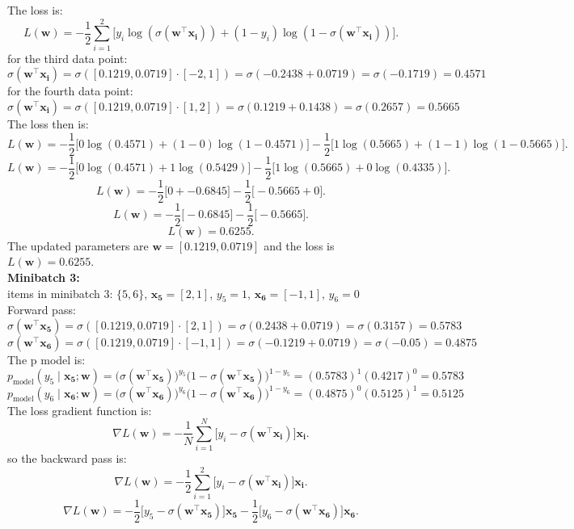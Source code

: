 \documentclass[a3paper,12pt]{article} %
\begin{document}
The loss is:
\[
L(\mathbf{w}) = -\frac{1}{2} \sum^2_{i=1} \big[y_i \log(\sigma(\mathbf{w}^\top \mathbf{x_i})) + (1-y_i) \log(1-\sigma(\mathbf{w}^\top \mathbf{x_i}))\big].
\]
for the third data point:
\[
    \sigma(\mathbf{w}^\top \mathbf{x_i}) = \sigma([0.1219, 0.0719] \cdot [-2, 1]) = \sigma(-0.2438 + 0.0719) = \sigma(-0.1719) = 0.4571
\]
for the fourth data point:
\[
    \sigma(\mathbf{w}^\top \mathbf{x_i}) = \sigma([0.1219, 0.0719] \cdot [1, 2]) = \sigma(0.1219 + 0.1438) = \sigma(0.2657) = 0.5665
\]
The loss then is:
\[
L(\mathbf{w}) = -\frac{1}{2} \big[0 \log(0.4571) + (1-0) \log(1-0.4571)\big] - \frac{1}{2} \big[1 \log(0.5665) + (1-1) \log(1-0.5665)\big].
\]
\[
L(\mathbf{w}) = -\frac{1}{2} \big[0 \log(0.4571) + 1 \log(0.5429)\big] - \frac{1}{2} \big[1 \log(0.5665) + 0 \log(0.4335)\big].
\]
\[
L(\mathbf{w}) = -\frac{1}{2} \big[0 + -0.6845\big] - \frac{1}{2} \big[-0.5665 + 0\big].
\]
\[
L(\mathbf{w}) = -\frac{1}{2} \big[-0.6845\big] - \frac{1}{2} \big[-0.5665\big].
\]
\[
L(\mathbf{w}) = 0.6255.
\]
The updated parameters are \(\mathbf{w} = \mathbf{[0.1219, 0.0719]}\) and the loss is \(L(\mathbf{w}) = \mathbf{0.6255}\).
\\ \textbf{Minibatch 3:}
\\ items in minibatch 3: \(\{5, 6\}\), \(\mathbf{x_5} = [2, 1]\), \(y_5 = 1\), \(\mathbf{x_6} = [-1, 1]\), \(y_6 = 0\)
\\ Forward pass:
\[
\sigma(\mathbf{w}^\top \mathbf{x_5}) = \sigma([0.1219, 0.0719] \cdot [2, 1]) = \sigma(0.2438 + 0.0719) = \sigma(0.3157) = 0.5783
\]
\[
\sigma(\mathbf{w}^\top \mathbf{x_6}) = \sigma([0.1219, 0.0719] \cdot [-1, 1]) = \sigma(-0.1219 + 0.0719) = \sigma(-0.05) = 0.4875
\]
The p model is:
\[
p_{\text{model}}(y_5 \mid \mathbf{x_5}; \mathbf{w}) = \big(\sigma(\mathbf{w}^\top \mathbf{x_5})\big)^{y_5} \big(1 - \sigma(\mathbf{w}^\top \mathbf{x_5})\big)^{1-y_5} = (0.5783)^1 (0.4217)^0 = 0.5783
\]
\[
p_{\text{model}}(y_6 \mid \mathbf{x_6}; \mathbf{w}) = \big(\sigma(\mathbf{w}^\top \mathbf{x_6})\big)^{y_6} \big(1 - \sigma(\mathbf{w}^\top \mathbf{x_6})\big)^{1-y_6} = (0.4875)^0 (0.5125)^1 = 0.5125
\]
The loss gradient function is:
\[
\nabla L(\mathbf{w}) = -\frac{1}{N} \sum^N_{i=1} \big[y_i - \sigma(\mathbf{w}^\top \mathbf{x_i})\big] \mathbf{x_i}.
\]
so the backward pass is:
\[
\nabla L(\mathbf{w}) = -\frac{1}{2} \sum^2_{i=1} \big[y_i - \sigma(\mathbf{w}^\top \mathbf{x_i})\big] \mathbf{x_i}.
\]
\[
\nabla L(\mathbf{w}) = -\frac{1}{2} \big[y_5 - \sigma(\mathbf{w}^\top \mathbf{x_5})\big] \mathbf{x_5} - \frac{1}{2} \big[y_6 - \sigma(\mathbf{w}^\top \mathbf{x_6})\big] \mathbf{x_6}.
\]
\end{document}
